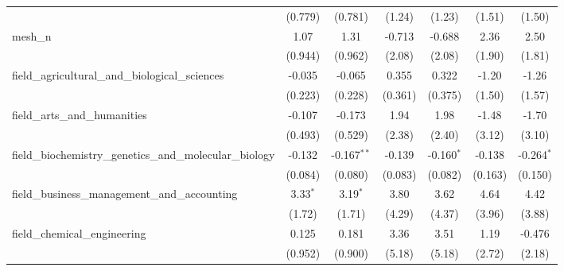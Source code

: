 \begin{tabular}{lcccccc}
                                                               & (0.779)        & (0.781)        & (1.24)         & (1.23)         & (1.51)         & (1.50)\\   
   mesh\_n                                                     & 1.07           & 1.31           & -0.713         & -0.688         & 2.36           & 2.50\\   
                                                               & (0.944)        & (0.962)        & (2.08)         & (2.08)         & (1.90)         & (1.81)\\   
   field\_agricultural\_and\_biological\_sciences              & -0.035         & -0.065         & 0.355          & 0.322          & -1.20          & -1.26\\   
                                                               & (0.223)        & (0.228)        & (0.361)        & (0.375)        & (1.50)         & (1.57)\\   
   field\_arts\_and\_humanities                                & -0.107         & -0.173         & 1.94           & 1.98           & -1.48          & -1.70\\   
                                                               & (0.493)        & (0.529)        & (2.38)         & (2.40)         & (3.12)         & (3.10)\\   
   field\_biochemistry\_genetics\_and\_molecular\_biology      & -0.132         & -0.167$^{**}$  & -0.139         & -0.160$^{*}$   & -0.138         & -0.264$^{*}$\\   
                                                               & (0.084)        & (0.080)        & (0.083)        & (0.082)        & (0.163)        & (0.150)\\   
   field\_business\_management\_and\_accounting                & 3.33$^{*}$     & 3.19$^{*}$     & 3.80           & 3.62           & 4.64           & 4.42\\   
                                                               & (1.72)         & (1.71)         & (4.29)         & (4.37)         & (3.96)         & (3.88)\\   
   field\_chemical\_engineering                                & 0.125          & 0.181          & 3.36           & 3.51           & 1.19           & -0.476\\   
                                                               & (0.952)        & (0.900)        & (5.18)         & (5.18)         & (2.72)         & (2.18)\\   

\end{tabular}
